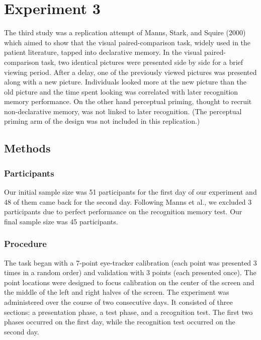 \documentclass[
  english,
  man,floatsintext]{apa6}
\begin{document}
\hypertarget{experiment-3}{%
\section{Experiment 3}\label{experiment-3}}

The third study was a replication attempt of Manns, Stark, and Squire (2000) which aimed to show that the visual paired-comparison task, widely used in the patient literature, tapped into declarative memory. In the visual paired-comparison task, two identical pictures were presented side by side for a brief viewing period. After a delay, one of the previously viewed pictures was presented along with a new picture. Individuals looked more at the new picture than the old picture and the time spent looking was correlated with later recognition memory performance. On the other hand perceptual priming, thought to recruit non-declarative memory, was not linked to later recognition. (The perceptual priming arm of the design was not included in this replication.)

\hypertarget{methods-2}{%
\subsection{Methods}\label{methods-2}}

\hypertarget{participants-3}{%
\subsubsection{Participants}\label{participants-3}}

Our initial sample size was 51 participants for the first day of our experiment and 48 of them came back for the second day. Following Manns et al., we excluded 3 participants due to perfect performance on the recognition memory test. Our final sample size was 45 participants.

\hypertarget{procedure-2}{%
\subsubsection{Procedure}\label{procedure-2}}

The task began with a 7-point eye-tracker calibration (each point was presented 3 times in a random order) and validation with 3 points (each presented once). The point locations were designed to focus calibration on the center of the screen and the middle of the left and right halves of the screen. The experiment was administered over the course of two consecutive days. It consisted of three sections: a presentation phase, a test phase, and a recognition test. The first two phases occurred on the first day, while the recognition test occurred on the second day.
\end{document}
